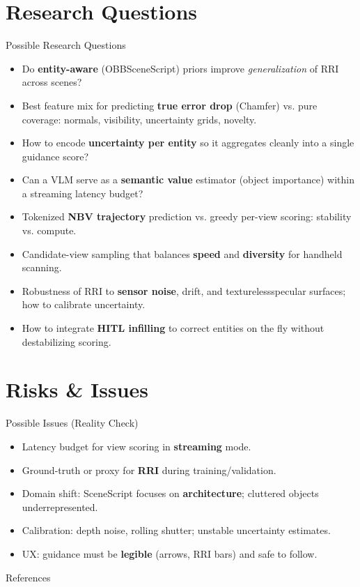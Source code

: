\documentclass[10pt,aspectratio=169]{beamer}
\begin{document}
\section{Research Questions}

\begin{frame}{Possible Research Questions}
\begin{itemize}
  \item Do \textbf{entity-aware} (OBB\/SceneScript) priors improve \emph{generalization} of RRI across scenes?
  \item Best feature mix for predicting \textbf{true error drop} (Chamfer) vs. pure coverage: normals, visibility, uncertainty grids, novelty.
  \item How to encode \textbf{uncertainty per entity} so it aggregates cleanly into a single guidance score?
  \item Can a VLM serve as a \textbf{semantic value} estimator (object importance) within a streaming latency budget?
  \item Tokenized \textbf{NBV trajectory} prediction vs. greedy per-view scoring: stability vs. compute.
  \item Candidate-view sampling that balances \textbf{speed} and \textbf{diversity} for handheld scanning.
  \item Robustness of RRI to \textbf{sensor noise}, drift, and textureless\/specular surfaces; how to calibrate uncertainty.
  \item How to integrate \textbf{HITL infilling} to correct entities on the fly without destabilizing scoring.
\end{itemize}
\end{frame}

\section{Risks \& Issues}

\begin{frame}{Possible Issues (Reality Check)}
\begin{itemize}
  \item Latency budget for view scoring in \textbf{streaming} mode.
  \item Ground-truth or proxy for \textbf{RRI} during training/validation.
  \item Domain shift: SceneScript focuses on \textbf{architecture}; cluttered objects underrepresented.
  \item Calibration: depth noise, rolling shutter; unstable uncertainty estimates.
  \item UX: guidance must be \textbf{legible} (arrows, RRI bars) and safe to follow.
\end{itemize}
\end{frame}

\begin{frame}[allowframebreaks]{References}
  
  
\end{frame}
\end{document}
